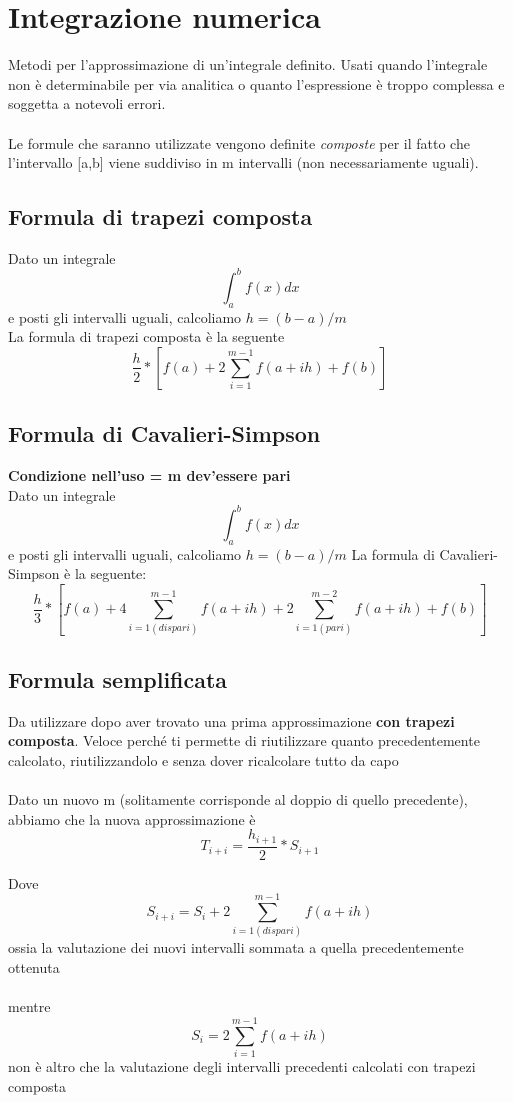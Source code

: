 \section{Integrazione numerica}
\label{Integrazione numerica}
Metodi per l'approssimazione di un'integrale definito. Usati quando l'integrale non è determinabile per via analitica o quanto l'espressione è troppo complessa e soggetta a notevoli errori.
\\
\\
\noindent
Le formule che saranno utilizzate vengono definite \textit{composte} per il fatto che l'intervallo [a,b] viene suddiviso in m intervalli (non necessariamente uguali).
\subsection{Formula di trapezi composta}
\label{Formula di trapezi composta}
Dato un integrale $$\int_{a}^{b} f(x) dx$$ 
e posti gli intervalli uguali, calcoliamo $h = (b-a)/m$
\\
La formula di trapezi composta è la seguente $$\dfrac{h}{2} *[f(a) + 2 \sum_{i=1}^{m-1}f(a+ih) + f(b)]$$

\subsection{Formula di Cavalieri-Simpson}
\label{Formula di Cavalieri-Simpson}
\textbf{Condizione nell'uso = m dev'essere pari}\\
Dato un integrale $$\int_{a}^{b} f(x) dx$$ 
e posti gli intervalli uguali, calcoliamo $h = (b-a)/m$
La formula di Cavalieri-Simpson è la seguente: $$\dfrac{h}{3} *[f(a)+ 4 \sum_{i=1(dispari)}^{m-1}f(a+ih) + 2 \sum_{i=1(pari)}^{m-2}f(a+ih) + f(b)]$$

\subsection{Formula semplificata}
\label{Formula semplificata}
Da utilizzare dopo aver trovato una prima approssimazione \textbf{con trapezi composta}. Veloce perché ti permette di riutilizzare quanto precedentemente calcolato, riutilizzandolo e senza dover ricalcolare tutto da capo\\ \\
Dato un nuovo m (solitamente corrisponde al doppio di quello precedente), abbiamo che la nuova approssimazione è $$ T_{i+i} = \dfrac{h_{i+1}}{2} * S_{i+1}$$

Dove $$S_{i+i} = S_i + 2 \sum_{i=1(dispari)}^{m-1}f(a+ih) $$ ossia la valutazione dei nuovi intervalli sommata a quella precedentemente ottenuta \\ \\
mentre $$S_i =  2 \sum_{i=1}^{m-1}f(a+ih)$$ non è altro che la valutazione degli intervalli precedenti calcolati con trapezi composta